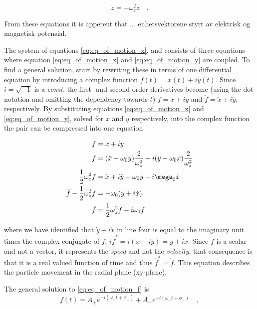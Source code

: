 \documentclass[../main_proj3.tex]{subfiles}
\begin{document}
\begin{equation}
\label{eq:eq_of_motion_z}
\ddot z = - \omega_z^{2} z \quad .
\end{equation}

From these equations it is apperent that ... enhetsvektorene styrt av elektrisk og magnetisk potensial. 

The system of equations \eqref{eq:eq_of_motion_x}, \label{eq:eq_of_motion_y} and \label{eq:eq_of_motion_z} consists of three equations where equation \eqref{eq:eq_of_motion_x} and \eqref{eq:eq_of_motion_y} are coupled. To find a general solution, start by rewriting these in terms of one differential equation by introducing a complex function $f(t)=x(t) + iy(t)$. Since $i= \sqrt{-1}$ is a \textit{const.} the first- and second-order derivatives become (using the dot notation and omitting the dependency towards $t$) $\dot f = \dot x + i \dot y$ and $\ddot f = \ddot x + i \ddot y$, respectively. By substituting equations \eqref{eq:eq_of_motion_x} and \eqref{eq:eq_of_motion_y}, solved for $x$ and $y$ respectively, into the complex function the pair can be compressed into one equation 

\begin{equation}
\label{eq:eq_of_motion_f}
\begin{split}
    f & = x + iy \\
    f & = (\ddot{x} - \omega_0 \dot{y}) \frac{2}{\omega_z^{2}} + i (\ddot{y} - \omega_0 \dot{x}) \frac{2}{\omega_z^{2}} \\
    \frac{1}{2} \omega_z^{2} f & = \ddot{x} + i\ddot{y} - \omega_0 \dot{y} - i \mega_0 \dot{x} \\
    \ddot{f} - \frac{1}{2} \omega_z^{2} f &= - \omega_0 ( \dot{y} +i \dot{x}) \\
    \ddot{f} & = \frac{1}{2} \omega_z^{2} f - i \omega_0 \dot{f}
\end{split}
\end{equation}

where we have identified that $\dot{y} +i \dot{x}$ in line four is equal to the imaginary unit times the complex conjugate of $f$; $i\dot{f}^* = i(\dot{x} - i\dot{y}) = \dot{y} + i \dot{x}$. Since $\dot{f}$ is a scalar and not a vector, it represents the \textit{speed} and not the \textit{velocity}, that consequence is that it is a real valued function of time and thus $\dot{f}^* = \dot{f}$. This equation describes the particle movement in the radial plane (xy-plane).

The general solution to \eqref{eq:eq_of_motion_f} is 
\begin{equation}
\label{eq:general_solution-eq_of_motion_f}
    f(t) = A_+ e^{-i(\omega_+ t + \phi_+)} + A_- e^{-i(\omega_- t + \phi_-)} \quad ,
\end{equation}
\end{document}
